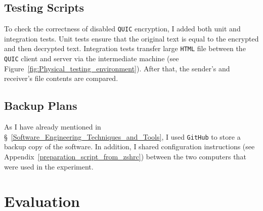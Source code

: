 \documentclass[12pt,a4paper]{report}
\begin{document}
\section{Testing Scripts}

To check the correctness of disabled \texttt{QUIC} encryption, I added both unit and integration tests.
Unit tests ensure that the original text is equal to the encrypted and then decrypted text.
Integration tests transfer large \texttt{HTML} file between the \texttt{QUIC} client and server via the intermediate machine (see Figure~\ref{fig:Physical_testing_environment}).
After that, the sender's and receiver's file contents are compared.


\section{Backup Plans}
As I have already mentioned in \S~\ref{Software_Engineering_Techniques_and_Tools}, I used \texttt{GitHub} to store a backup copy of the software.
In addition, I shared configuration instructions (see Appendix~\ref{preparation_script_from_zshrc}) between the two computers that were used in the experiment.



\chapter{Evaluation}


\end{document}
